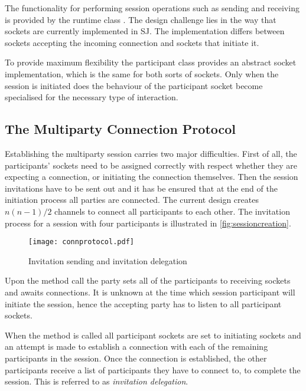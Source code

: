 The functionality for performing session operations such as sending and receiving is provided by the runtime class . The design challenge lies in the way that sockets are currently implemented in SJ. The implementation differs between sockets accepting the incoming connection and sockets that initiate it.

To provide maximum flexibility the participant class provides an abstract socket implementation, which is the same for both sorts of sockets. Only when the session is initiated does the behaviour of the participant socket become specialised for the necessary type of interaction. 

\subsection{The Multiparty Connection Protocol}

Establishing the multiparty session carries two major difficulties. First of all, the participants' sockets need to be assigned correctly with respect whether they are expecting a connection, or initiating the connection themselves. Then the session invitations have to be sent out and it has be ensured that at the end of the initiation process all parties are connected. The current design creates $n (n-1) /2 $ channels to connect all participants to each other. The invitation process for a session with four participants is illustrated in \autoref{fig:sessioncreation}.  


\begin{figure}[H]
\begin{center}
\texttt{[image: connprotocol.pdf]}
\caption{Invitation sending and invitation delegation}
\label{fig:sessioncreation}
\end{center}
\end{figure}

Upon the method call  the party sets all of the participants to receiving sockets and awaits connections. It is unknown at the time which session participant will initiate the session, hence the accepting party has to listen to all participant sockets.

When the method  is called all participant sockets are set to initiating sockets and an attempt is made to establish a connection with each of the remaining participants in the session. Once the connection is established, the other participants receive a list of participants they have to connect to, to complete the session. This is referred to as \textit{invitation delegation}.

